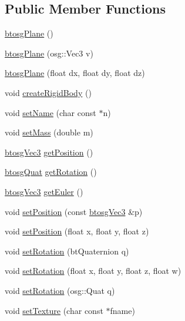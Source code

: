 \subsection*{Public Member Functions}
\begin{DoxyCompactItemize}
\item 
\hyperlink{classbtosgPlane_a363737cea03a886470a1a46003706268}{btosg\+Plane} ()
\item 
\hyperlink{classbtosgPlane_a4bc8b74d62426eb5fa66355b71569db2}{btosg\+Plane} (osg\+::\+Vec3 v)
\item 
\hyperlink{classbtosgPlane_a295ebe4cb55a2786764c7840d10895f4}{btosg\+Plane} (float dx, float dy, float dz)
\item 
void \hyperlink{classbtosgPlane_a0e6812c186ed1fa128dccf7cd2e525a6}{create\+Rigid\+Body} ()
\item 
void \hyperlink{classbtosgObject_ab06a1b3f357209214c6440cd5746523e}{set\+Name} (char const $\ast$n)
\item 
void \hyperlink{classbtosgObject_a91da93c82d48b86192f0cbb16054fe57}{set\+Mass} (double m)
\item 
\hyperlink{classbtosgVec3}{btosg\+Vec3} \hyperlink{classbtosgObject_a3dadd5da8f2a312e44a039446b93d4cd}{get\+Position} ()
\item 
\hyperlink{classbtosgQuat}{btosg\+Quat} \hyperlink{classbtosgObject_a3b825999ad3a51bde743d4085ff19dae}{get\+Rotation} ()
\item 
\hyperlink{classbtosgVec3}{btosg\+Vec3} \hyperlink{classbtosgObject_a2019ec63bde02b72600450c7c985e77a}{get\+Euler} ()
\item 
void \hyperlink{classbtosgObject_ace6b51040b7ddce90818174200cc6074}{set\+Position} (const \hyperlink{classbtosgVec3}{btosg\+Vec3} \&p)
\item 
void \hyperlink{classbtosgObject_adb9f2cff0faf66dc252cd7c97b11ac84}{set\+Position} (float x, float y, float z)
\item 
void \hyperlink{classbtosgObject_a656412794a971a10478aedb520f298bf}{set\+Rotation} (bt\+Quaternion q)
\item 
void \hyperlink{classbtosgObject_a4d21ca59b944fd26644db35d3e9ba67a}{set\+Rotation} (float x, float y, float z, float w)
\item 
void \hyperlink{classbtosgObject_ae803e0566f0d7b3ffca686b968b297f8}{set\+Rotation} (osg\+::\+Quat q)
\item 
void \hyperlink{classbtosgObject_aff54acbc7c66811efb0cf2838107a241}{set\+Texture} (char const $\ast$fname)
\item 

\end{DoxyCompactItemize}
